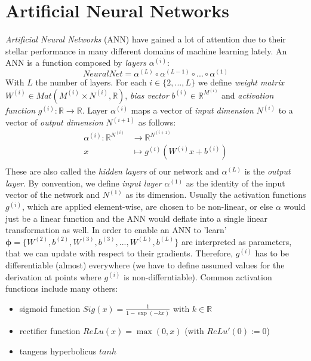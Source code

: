 \documentclass[12pt]{report}
\theoremstyle{definition}
\begin{document}
\section{Artificial Neural Networks}
\emph{Artificial Neural Networks} (ANN) have gained a lot of attention due to their stellar performance in many different domains of machine learning lately. An ANN is a function composed by \emph{layers} $\alpha^{(i)}$: 
\begin{equation}
NeuralNet = \alpha^{(L)} \circ \alpha^{(L-1)} \circ ... \circ \alpha^{(1)}
\end{equation}
With $L$ the number of layers. For each $i \in \{2, ..., L\} $ we define \emph{weight matrix} $W^{(i)} \in Mat(M^{(i)} \times N^{(i)}, \mathbb{R})$, \emph{bias vector} $b^{(i)} \in \mathbb{R}^{M^{(i)}}$ and \emph{activation function} $g^{(i)}: \mathbb{R} \rightarrow \mathbb{R}$. Layer $\alpha^{(i)}$ maps a vector of \emph{input dimension} $N^{(i)}$ to a vector of \emph{output dimension} $N^{(i+1)}$ as follows:
\begin{equation}
\begin{split}
\alpha^{(i)}: \mathbb{R}^{N^{(i)}} & \rightarrow \mathbb{R}^{N^{(i+1)}} \\
x & \mapsto g^{(i)}(W^{(i)}x+b^{(i)})\\
\end{split}
\end{equation}
These are also called the \emph{hidden layers} of our network and $\alpha^{(L)}$ is the \emph{output layer}. By convention, we define \emph{input layer} $\alpha^{(1)}$ as the identity of the input vector of the network and $N^{(1)}$ as its dimension.
Usually the activation functions $g^{(i)}$, which are applied element-wise, are chosen to be non-linear, or else $\alpha$ would just be a linear function and the ANN would deflate into a single linear transformation as well. 
In order to enable an ANN to 'learn' $\pmb{\phi} = \{W^{(2)},  b^{(2)}, W^{(3)},  b^{(3)}, ..., W^{(L)},  b^{(L)}\}$ are interpreted as parameters, that we can update with respect to their gradients. Therefore, $g^{(i)}$ has to be differentiable (almost) everywhere (we have to define assumed values for the derivation at points where $g^{(i)}$ is non-differntiable). Common activation functions include many others:
\begin{itemize}
\item sigmoid function $Sig(x) = \frac{1}{1 - \exp(-kx)}$ with $k \in \mathbb{R}$
\item rectifier function $ReLu(x) = \max(0, x)$ (with $ReLu'(0) := 0$)
\item tangens hyperbolicus $tanh$
\end{itemize} 
\end{document}

